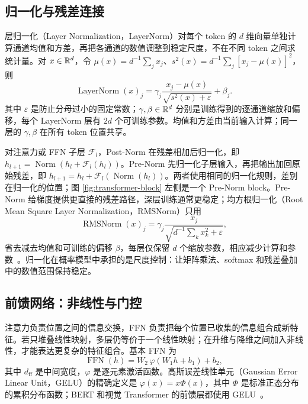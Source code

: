 \subsection{归一化与残差连接}

层归一化（Layer Normalization，LayerNorm）对每个 token 的 \(d\) 维向量单独计算通道均值和方差，再把各通道的数值调整到稳定尺度，不在不同 token 之间求统计量。对 \(x\in\mathbb{R}^d\)，令 \(\mu(x)=d^{-1}\sum_jx_j\)、\(s^2(x)=d^{-1}\sum_j[x_j-\mu(x)]^2\)，则
\begin{equation}
 \operatorname{LayerNorm}(x)_j=\gamma_j\frac{x_j-\mu(x)}{\sqrt{s^2(x)+\varepsilon}}+\beta_j.
\end{equation}
其中 \(\varepsilon\) 是防止分母过小的固定常数；\(\gamma,\beta\in\mathbb{R}^d\) 分别是训练得到的逐通道缩放和偏移，每个 LayerNorm 层有 \(2d\) 个可训练参数。均值和方差由当前输入计算；同一层的 \(\gamma,\beta\) 在所有 token 位置共享。

对注意力或 FFN 子层 \(\mathcal F_l\)，Post-Norm 在残差相加后归一化，即 \(h_{l+1}=\operatorname{Norm}(h_l+\mathcal F_l(h_l))\)。Pre-Norm 先归一化子层输入，再把输出加回原始残差，即 \(h_{l+1}=h_l+\mathcal F_l(\operatorname{Norm}(h_l))\)。两者使用相同的归一化规则，差别在归一化的位置；图 \ref{fig:transformer-block} 左侧是一个 Pre-Norm block。Pre-Norm 给梯度提供更直接的残差路径，深层训练通常更稳定；均方根归一化（Root Mean Square Layer Normalization，RMSNorm）只用
\begin{equation}
\operatorname{RMSNorm}(x)_j=\gamma_j\frac{x_j}{\sqrt{d^{-1}\sum_kx_k^2+\varepsilon}},
\end{equation}
省去减去均值和可训练的偏移 \(\beta\)，每层仅保留 \(d\) 个缩放参数，相应减少计算和参数~\cite{zhang2019rmsnorm}。归一化在概率模型中承担的是尺度控制：让矩阵乘法、softmax 和残差叠加中的数值范围保持稳定。

\subsection{前馈网络：非线性与门控}

注意力负责位置之间的信息交换，FFN 负责把每个位置已收集的信息组合成新特征。若只堆叠线性映射，多层仍等价于一个线性映射；在升维与降维之间加入非线性，才能表达更复杂的特征组合。基本 FFN 为
\begin{equation}
 \operatorname{FFN}(h)=W_2\,\varphi(W_1h+b_1)+b_2,
\end{equation}
其中 \(d_{\mathrm{ff}}\) 是中间宽度，\(\varphi\) 是逐元素激活函数。高斯误差线性单元（Gaussian Error Linear Unit，GELU）的精确定义是 \(\varphi(x)=x\Phi(x)\)，其中 \(\Phi\) 是标准正态分布的累积分布函数；BERT 和视觉 Transformer 的前馈层都使用 GELU~\cite{devlin2019bert,dosovitskiy2021vit}。

